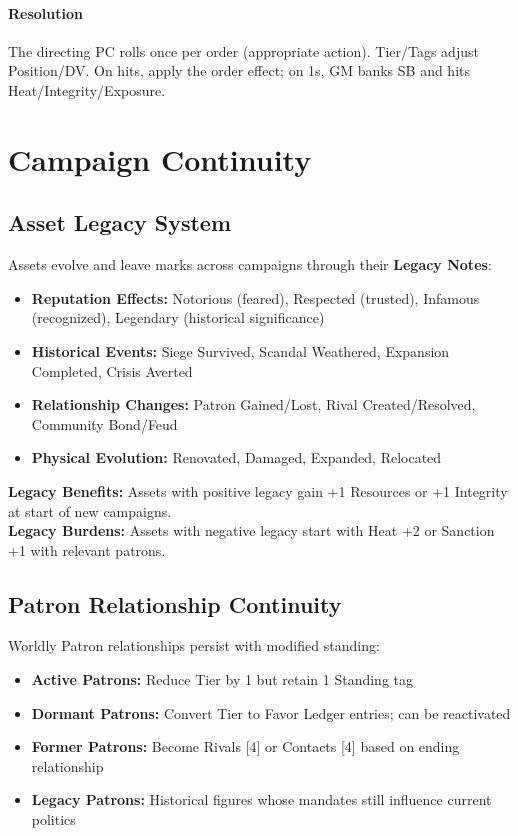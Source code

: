 \documentclass[11pt]{article}
\begin{document}
\paragraph{Resolution} The directing PC rolls once per order (appropriate action). Tier/Tags adjust Position/DV. On hits, apply the order effect; on 1s, GM banks SB and hits Heat/Integrity/Exposure.

\section{Campaign Continuity}
\subsection{Asset Legacy System}
Assets evolve and leave marks across campaigns through their \textbf{Legacy Notes}:
\begin{itemize}
  \item \textbf{Reputation Effects:} Notorious (feared), Respected (trusted), Infamous (recognized), Legendary (historical significance)
  \item \textbf{Historical Events:} Siege Survived, Scandal Weathered, Expansion Completed, Crisis Averted
  \item \textbf{Relationship Changes:} Patron Gained/Lost, Rival Created/Resolved, Community Bond/Feud
  \item \textbf{Physical Evolution:} Renovated, Damaged, Expanded, Relocated
\end{itemize}

\textbf{Legacy Benefits:} Assets with positive legacy gain +1 Resources or +1 Integrity at start of new campaigns.\\
\textbf{Legacy Burdens:} Assets with negative legacy start with Heat +2 or Sanction +1 with relevant patrons.

\subsection{Patron Relationship Continuity}
Worldly Patron relationships persist with modified standing:
\begin{itemize}
  \item \textbf{Active Patrons:} Reduce Tier by 1 but retain 1 Standing tag
  \item \textbf{Dormant Patrons:} Convert Tier to Favor Ledger entries; can be reactivated
  \item \textbf{Former Patrons:} Become Rivals [4] or Contacts [4] based on ending relationship
  \item \textbf{Legacy Patrons:} Historical figures whose mandates still influence current politics
\end{itemize}
\end{document}
